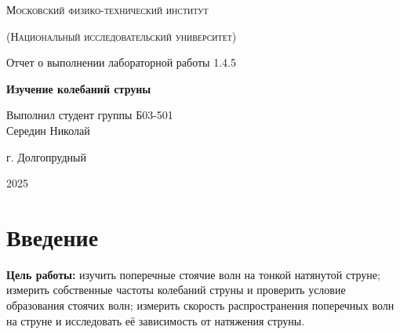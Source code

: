 \documentclass[a4paper, 12pt]{article}
\begin{document}
\thispagestyle{empty} %
\begin{titlepage}
	\centering

	{\scshape\large Московский физико-технический институт \par}
    {\scshape (Национальный исследовательский университет) \par}
    
	\vspace{3cm}
	{\LARGE Отчет о выполнении лабораторной работы 1.4.5 \par}
    
	\vspace{1cm}
    {\Huge\bfseries  Изучение колебаний струны \par} 
    
	\vfill
\begin{flushright}
	{\large Выполнил студент группы Б03-501 \\ Середин Николай}
\end{flushright}
	\vspace{2cm}
    г. Долгопрудный
    
    2025
\end{titlepage}

\pagestyle{fancy} %
\fancyhf{} %
\fancyhead[L]{} %
\fancyhead[R]{} %
\fancyfoot[C]{\rule[0.5ex]{0.05\textwidth}{0.4pt}\quad\thepage\quad\rule[0.5ex]{0.05\textwidth}{0.4pt}}
\renewcommand{\headrulewidth}{0.4pt}

\newpage
\section{Введение} %

{\bfseries Цель работы:} изучить поперечные стоячие волн на тонкой натянутой струне;
измерить собственные частоты колебаний струны и проверить условие образования
стоячих волн; измерить скорость распространения поперечных волн на струне и исследовать её зависимость от натяжения струны.
\end{document}
